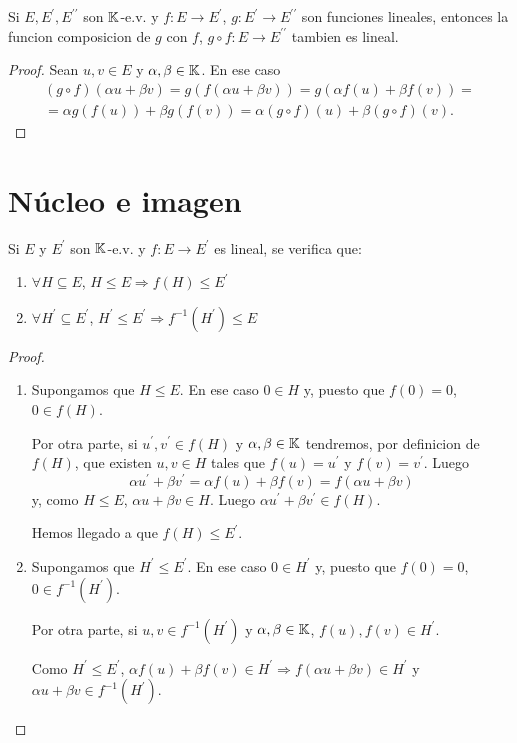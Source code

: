 \begin{proposition}
	Si \(E, E^\prime, E^{\prime \prime } \) son \(\mathbb{K}\)-e.v. y \(f \colon E \to E^\prime\), \(g \colon E^\prime \to E^{\prime\prime } \) son funciones lineales, entonces la funcion composicion de \(g \) con \(f \), \(g \circ f \colon E \to E^{\prime\prime }\) tambien es lineal.
\end{proposition}
\begin{proof}
	Sean \(u,v \in E \) y \(\alpha,\beta \in \mathbb{K} \). En ese caso
	\begin{multline*}
		(g \circ f)(\alpha u + \beta v) = g(f(\alpha u + \beta v)) = g(\alpha f(u) + \beta f(v)) = \\
		= \alpha g(f(u)) + \beta g(f(v)) = \alpha (g \circ  f)(u) + \beta (g \circ  f)(v).
	\end{multline*}
\end{proof}
\section{Núcleo e imagen}
\begin{proposition}
	Si \(E \) y \(E^\prime  \) son \(\mathbb{K} \)-e.v. y \(f \colon E \to E^\prime  \) es lineal, se verifica que:
	\begin{enumerate}
		\item \(\forall H \subseteq E \), \(H \leq E \Rightarrow f(H) \leq E^\prime \)
		\item \(\forall H^\prime \subseteq E^\prime \), \(H^\prime  \leq E^\prime \Rightarrow f^{-1} (H^\prime ) \leq E \)
	\end{enumerate}
\end{proposition}
\begin{proof}
	\begin{enumerate}
		\item Supongamos que \(H \leq E \). En ese caso \(0 \in H \) y, puesto que \(f(0) = 0 \), \(0 \in f(H )\).

		      Por otra parte, si \(u^\prime, v^\prime \in f(H )\) y \(\alpha,\beta \in \mathbb{K} \) tendremos, por definicion de \(f(H)\), que existen \(u,v \in H \) tales que \(f(u) = u^\prime \) y \(f(v) = v^\prime \). Luego
		      \[
			      \alpha u^\prime + \beta v^\prime = \alpha f(u) + \beta f(v) = f(\alpha u + \beta v)
		      \]
		      y, como \(H \leq E \), \(\alpha u + \beta v \in H \). Luego \(\alpha u^\prime + \beta v^\prime \in f(H )\).

		      Hemos llegado a que \(f(H) \leq E^\prime \).
		\item Supongamos que \(H^\prime \leq E^\prime \). En ese caso \(0 \in H^\prime \) y, puesto que \(f(0) = 0\), \(0 \in f^{-1} (H^\prime )\).

		      Por otra parte, si \(u,v \in f^{-1} (H^\prime )\) y \(\alpha,\beta \in \mathbb{K} \), \(f(u), f(v) \in H^\prime \).

		      Como \(H^\prime \leq E^\prime \), \(\alpha f(u) + \beta f(v) \in H^\prime \Rightarrow f(\alpha u + \beta v) \in H^\prime \) y \(\alpha u + \beta v \in f^{-1} (H^\prime )\).
	\end{enumerate}
\end{proof}

